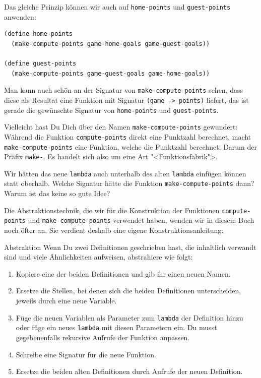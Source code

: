 %
Das gleiche Prinzip können wir auch auf \lstinline{home-points} und
\lstinline{guest-points} anwenden:
%
\begin{lstlisting}
(define home-points
  (make-compute-points game-home-goals game-guest-goals))

(define guest-points
  (make-compute-points game-guest-goals game-home-goals))
\end{lstlisting}
%
Man kann auch schön an der Signatur von
\lstinline{make-compute-points} sehen, dass diese als Resultat eine
Funktion mit Signatur \lstinline{(game -> points)} liefert, das ist
gerade die gewünschte Signatur von \lstinline{home-points} und
\lstinline{guest-points}.

Vielleicht hast Du Dich über den Namen \lstinline{make-compute-points}
gewundert: Während die Funktion \lstinline{compute-points} direkt eine Punktzahl
berechnet, macht \lstinline{make-compute-points} eine Funktion, welche
die Punktzahl berechnet: Darum der Präfix \lstinline{make-}.  Es
handelt sich also um eine Art "<Funktionsfabrik">.

\begin{aufgabeinline}
  Wir hätten das neue \lstinline{lambda} auch unterhalb des alten
  \lstinline{lambda} einfügen können statt oberhalb.  Welche Signatur
  hätte die Funktion \lstinline{make-compute-points} dann?  Warum ist
  das keine so gute Idee?
\end{aufgabeinline}

Die Abstraktionstechnik, die wir für die Konstruktion der Funktionen
\lstinline{compute-points} und \lstinline{make-compute-points}
verwendet haben, wenden wir in diesem Buch noch öfter an.  Sie
verdient deshalb eine eigene Konstruktionsanleitung:

\begin{konstruktionsanleitung}{Abstraktion}
  \label{ka:abstraktion}
  Wenn Du zwei Definitionen geschrieben hast, die inhaltlich verwandt
  sind und viele Ähnlichkeiten aufweisen, abstrahiere wie folgt:
  \begin{enumerate}
  \item Kopiere eine der beiden Definitionen und gib ihr einen neuen
    Namen.
  \item Ersetze die Stellen, bei denen sich die beiden Definitionen
    unterscheiden, jeweils durch eine neue Variable.
  \item Füge die neuen Variablen als Parameter zum \lstinline{lambda}
    der Definition hinzu oder füge ein neues \lstinline{lambda} mit
    diesen Parametern ein.  Du musst gegebenenfalls rekursive Aufrufe
    der Funktion anpassen.
  \item Schreibe eine Signatur für die neue Funktion.
  \item Ersetze die beiden alten Definitionen durch Aufrufe der neuen
    Definition.
  \end{enumerate}
\end{konstruktionsanleitung}

